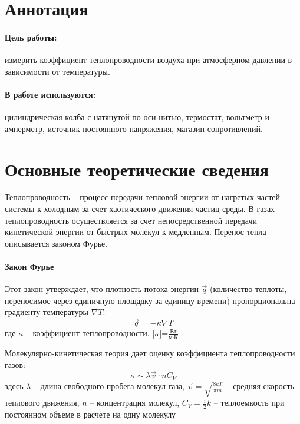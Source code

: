 \documentclass[a4paper,12pt]{report}
\begin{document}
	
	\newpage
    
    \section*{Аннотация}
        \paragraph*{Цель работы:} измерить коэффициент теплопроводности воздуха при атмосферном давлении в зависимости от температуры.
        \paragraph*{В работе используются:} цилиндрическая колба с натянутой по оси нитью, термостат, вольтметр и амперметр, источник постоянного напряжения, магазин сопротивлений.

    \section*{Основные теоретические сведения}
    Теплопроводность -- процесс передачи тепловой энергии от нагретых частей системы к холодным за счет хаотического движения частиц среды. В газах теплопроводность осуществляется за счет непосредственной передачи кинетической энергии от быстрых молекул к медленным. Перенос тепла описывается законом Фурье.
    \paragraph*{Закон Фурье}
    Этот закон утверждает, что плотность потока энергии $\vec{q}$ (количество теплоты, переносимое через единичную площадку за единицу времени) пропорциональна градиенту температуры $\nabla T$:
    \begin{equation}
        \label{fourier}
        \vec{q}=-\kappa \nabla T
    \end{equation}
    где $\kappa$ -- коэффициент теплопроводности. [$\kappa$]=$\frac{\text{Вт}}{\text{м}\cdot\text{К}}$

    Молекулярно-кинетическая теория дает оценку коэффициента теплопроводности газов:
    \begin{equation}
        \label{kappa approx}
        \kappa \sim \lambda \vec{v} \cdot n C_V
    \end{equation}
    здесь $\lambda$ -- длина свободного пробега молекул газа, $\vec{v}=\sqrt{\frac{8kT}{\pi m}}$ -- средняя скорость теплового движения, $n$ -- концентрация молекул, $C_V=\frac{i}{2}k$ -- теплоемкость при постоянном объеме в расчете на одну молекулу
\end{document}
